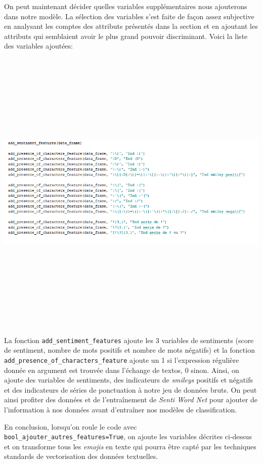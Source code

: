 On peut maintenant décider quelles variables supplémentaires nous ajouterons dans notre modèle. 
La sélection des variables s'est faite de façon assez subjective en analysant les comptes des attributs présentés dans la section  et en ajoutant les attributs qui semblaient avoir le plus grand pouvoir discriminant.
Voici la liste des variables ajoutées:

\includegraphics[width=\linewidth,height=14cm]{images/variables_autres}

La fonction \verb|add_sentiment_features| ajoute les 3 variables de sentiments (score de sentiment, nombre de mots positifs et nombre de mots négatifs) et la fonction \verb|add_presence_of_characters_feature| ajoute un 1 si l'expression régulière donnée en argument est trouvée dans l'échange de textos, 0 sinon.
Ainsi, on ajoute des variables de sentiments, des indicateurs de \emph{smileys} positifs et négatifs et des indicateurs de séries de ponctuation à notre jeu de données bruts.
On peut ainsi profiter des données et de l'entraînement de \emph{Senti Word Net} pour ajouter de l'information à nos données avant d'entraîner nos modèles de classification.

En conclusion, lorsqu'on roule le code avec \verb|bool_ajouter_autres_features=True|, on ajoute les variables décrites ci-dessus et on transforme tous les \emph{emojis} en texte qui pourra être capté par les techniques standards de vectorisation des données textuelles.